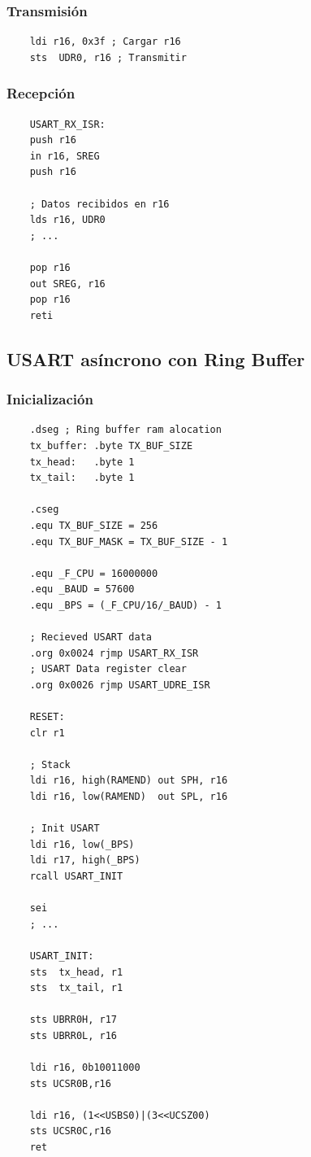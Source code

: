     \subsubsection{Transmisión}
    \begin{verbatim}
    ldi r16, 0x3f ; Cargar r16 
    sts  UDR0, r16 ; Transmitir
    \end{verbatim}
    \subsubsection{Recepción}

    \begin{verbatim}
    USART_RX_ISR:
    push r16 
    in r16, SREG 
    push r16 

    ; Datos recibidos en r16
    lds r16, UDR0
    ; ...

    pop r16
    out SREG, r16
    pop r16	
    reti
    \end{verbatim}
    
\subsection{USART asíncrono con Ring Buffer}

    \subsubsection{Inicialización}
    \begin{verbatim}
    .dseg ; Ring buffer ram alocation
    tx_buffer: .byte TX_BUF_SIZE  
    tx_head:   .byte 1            
    tx_tail:   .byte 1           

    .cseg
    .equ TX_BUF_SIZE = 256
    .equ TX_BUF_MASK = TX_BUF_SIZE - 1

    .equ _F_CPU = 16000000
    .equ _BAUD = 57600 
    .equ _BPS = (_F_CPU/16/_BAUD) - 1
    
    ; Recieved USART data
    .org 0x0024 rjmp USART_RX_ISR	
    ; USART Data register clear
    .org 0x0026 rjmp USART_UDRE_ISR 

    RESET:
    clr r1

    ; Stack 
    ldi r16, high(RAMEND) out SPH, r16
    ldi r16, low(RAMEND)  out SPL, r16

    ; Init USART
    ldi r16, low(_BPS)
    ldi r17, high(_BPS)
    rcall USART_INIT

    sei
    ; ...

    USART_INIT:	
    sts  tx_head, r1
    sts  tx_tail, r1

    sts UBRR0H, r17
    sts UBRR0L, r16

    ldi r16, 0b10011000
    sts UCSR0B,r16

    ldi r16, (1<<USBS0)|(3<<UCSZ00)
    sts UCSR0C,r16
    ret
    \end{verbatim}


